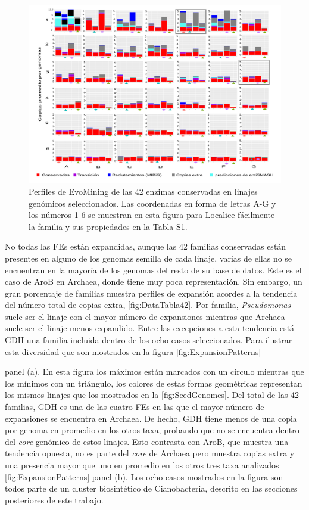\documentclass[12pt,twoside]{reedthesis}
\begin{document}
  \begin{figure}[h!tbp]
  \centering
  \includegraphics[angle = 0,scale = .6]{chapter2/FigurasPaper/Figure3S.pdf}
  \caption[Expansiones de las 42 enzimas comunes en Actinobacteria, Cyanobacteria, $Pseudomonas$ y Archaea]{\footnotesize{Perfiles de EvoMining  de las 42 enzimas conservadas en linajes genómicos seleccionados. Las coordenadas en forma de letras A-G y los números 1-6 se muestran en esta figura para
  Localice fácilmente la familia y sus propiedades en la Tabla S1.}}
  \label{fig:42Expansiones}
  \end{figure}
  
  No todas las FEs están expandidas, aunque las 42 familias conservadas
  están presentes en alguno de los genomas semilla de cada linaje, varias
  de ellas no se encuentran en la mayoría de los genomas del resto de su
  base de datos. Este es el caso de AroB en Archaea, donde tiene muy poca
  representación. Sin embargo, un gran porcentaje de familias muestra
  perfiles de expansión acordes a la tendencia del número total de copias
  extra, \autoref{fig:DataTabla42}. Por familia, \emph{Pseudomonas} suele
  ser el linaje con el mayor número de expansiones mientras que Archaea
  suele ser el linaje menos expandido. Entre las excepciones a esta
  tendencia está GDH una familia incluida dentro de los ocho casos
  seleccionados. Para ilustrar esta diversidad que son mostrados en la
  figura \autoref{fig:ExpansionPatterns}
  
  panel (a). En esta figura los máximos están marcados con un círculo
  mientras que los mínimos con un triángulo, los colores de estas formas
  geométricas representan los mismos linajes que los mostrados en la
  \autoref{fig:SeedGenomes}. Del total de las 42 familias, GDH es una de
  las cuatro FEs en las que el mayor número de expansiones se encuentra en
  Archaea. De hecho, GDH tiene menos de una copia por genoma en promedio
  en los otros taxa, probando que no se encuentra dentro del \emph{core}
  genómico de estos linajes. Esto contrasta con AroB, que muestra una
  tendencia opuesta, no es parte del \emph{core} de Archaea pero muestra
  copias extra y una presencia mayor que uno en promedio en los otros tres
  taxa analizados \autoref{fig:ExpansionPatterns} panel (b). Los ocho
  casos mostrados en la figura son todos parte de un cluster biosintético
  de Cianobacteria, descrito en las secciones posteriores de este trabajo.
  
\end{document}
